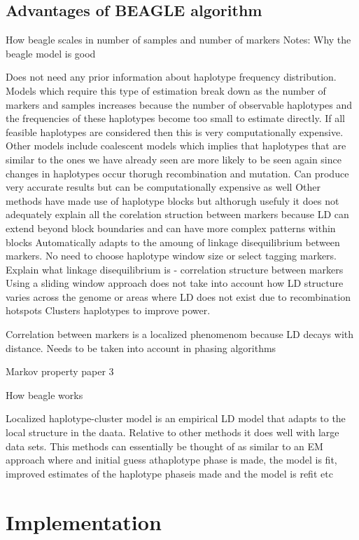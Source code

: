 \documentclass[a4paper,12pt,twoside,abstraction,titlepage]{article}
\begin{document}
\subsection{Advantages of BEAGLE algorithm}

How beagle scales in number of samples and number of markers
Notes:
Why the beagle model is good

Does not need any prior information about haplotype frequency distribution. Models which require this type of estimation break down as the number of markers and samples increases because the number of observable haplotypes and the frequencies of these haplotypes become too small to estimate directly. If all feasible haplotypes are considered then this is very computationally expensive.
Other models include coalescent models which implies that haplotypes that are similar to the ones we have already seen are more likely to be seen again since changes in haplotypes occur thorugh recombination and mutation. Can produce very accurate results but can be computationally expensive as well
Other methods have made use of haplotype blocks but althorugh usefuly it does not adequately explain all the corelation struction between markers because LD can extend beyond block boundaries and can have more complex patterns within blocks
Automatically adapts to the amoung of linkage disequilibrium between markers.  No need to choose haplotype window size or select tagging markers.
Explain what linkage disequilibrium is - correlation structure between markers
Using a sliding window approach does not take into account how LD structure varies across the genome or areas where LD does not exist due to recombination hotspots 
Clusters haplotypes to improve power.

Correlation between markers is a localized phenomenom because LD decays with distance. Needs to be taken into account in phasing algorithms

Markov property
paper 3


How beagle works

Localized haplotype-cluster model is an empirical LD model that adapts to the local structure in the daata. Relative to other methods it does well with large data sets. This methods can essentially be thought of as similar to an EM approach where and initial guess athaplotype phase is made, the model is fit, improved estimates of the haplotype phaseis made and the model is refit etc

\newpage
\section{Implementation}
\end{document}
